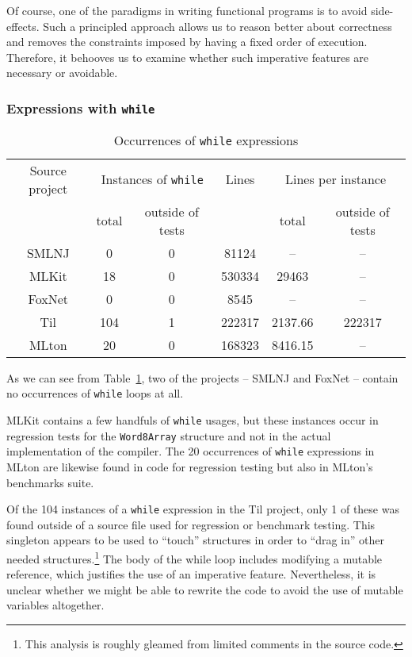 \documentclass[12pt,abstracton]{scrartcl}
\begin{document}
Of course, one of the paradigms in writing functional programs is to avoid side-effects.
Such a principled approach allows us to reason better about correctness and
removes the constraints imposed by having a fixed order of execution.\cite{Hug90} Therefore,
it behooves us to examine whether such imperative features are necessary or avoidable.
\subsubsection{Expressions with \texttt{while}}
\begin{table}[h!]
\centering
\begin{tabular}{|c||c|c||c|c|c|}
\hline
Source project & \multicolumn{2}{c||}{Instances of \texttt{while}} & Lines & \multicolumn{2}{c|}{Lines per instance} \\ \cline{2-3}\cline{5-6}
 & total & outside of tests &  & total & outside of tests \\ \hline\hline
SMLNJ & 0 & 0 & 81124 & -- & --\\ 
MLKit & 18 & 0 & 530334 & 29463 & --\\
FoxNet & 0 & 0 & 8545 & -- & -- \\
Til & 104 & 1 & 222317 & 2137.66 & 222317 \\
MLton & 20 & 0 & 168323 & 8416.15 & --\\ \hline
\end{tabular}
\caption{Occurrences of \texttt{while} expressions}
\label{table:while}
\end{table}
As we can see from Table~\ref{table:while}, two of the projects -- SMLNJ and FoxNet -- contain no occurrences
of \texttt{while} loops at all.

MLKit contains a few handfuls of \texttt{while} usages, but these instances
occur in regression tests for the \texttt{Word8Array} structure and not in the actual implementation of the compiler.
The 20 occurrences of \texttt{while} expressions in MLton are likewise found in code for regression testing but
also in MLton's benchmarks suite.

Of the 104 instances of a \texttt{while} expression in the Til project,
only 1 of these was found outside of a source file used for regression or benchmark testing.
This singleton appears to be used to ``touch''
structures in order to ``drag in'' other needed structures.\footnote{This analysis is roughly gleamed from limited comments in the source code.}
The body of the while loop includes modifying a mutable reference, which justifies the use of
an imperative feature. Nevertheless, it is unclear whether we might be able to rewrite the code
to avoid the use of mutable variables altogether.
\end{document}
